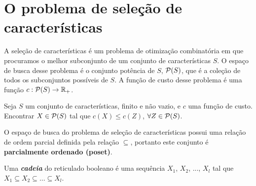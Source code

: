 
\section{O problema de seleção de características}
A seleção de características é um problema de otimização combinatória 
em que procuramos o melhor subconjunto de um conjunto de características
$S$. O espaço de busca desse problema é o conjunto potência de $S$, 
$\mathcal{P} (S)$, que é a coleção de todos os subconjuntos possíveis de
 $S$. A função de custo desse problema é uma função $c : \mathcal{P} (S) 
\to \mathbb{R}_{+}$.

\begin{mydefinition} Seja $S$
um conjunto de características, finito e não vazio, e $c$ uma função de 
custo. Encontrar $X \in \mathcal{P} (S)$ tal que $c (X) \leq c (Z)$,
$\forall Z \in \mathcal{P} (S)$.
\end{mydefinition}

O espaço de busca do problema de seleção de características possui uma
relação de ordem parcial definida pela relação $\subseteq$, portanto
este conjunto é {\bf parcialmente ordenado (poset)}.

\begin{mydefinition}
Uma {\bf \em cadeia} do reticulado booleano é uma sequência $X_1$, 
$X_2$, ..., $X_l$ tal que $X_1 \subseteq X_2 \subseteq \dots 
\subseteq X_l$.
\end{mydefinition}




